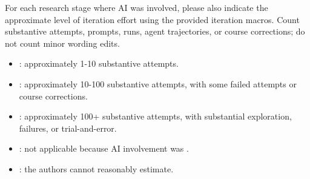 \documentclass{article}
\begin{document}
For each research stage where AI was involved, please also indicate the approximate level of iteration effort using the provided iteration macros. Count substantive attempts, prompts, runs, agent trajectories, or course corrections; do not count minor wording edits.

\begin{itemize}
    \item \iterationLow{}: approximately 1-10 substantive attempts.
    \item \iterationMedium{}: approximately 10-100 substantive attempts, with some failed attempts or course corrections.
    \item \iterationHigh{}: approximately 100+ substantive attempts, with substantial exploration, failures, or trial-and-error.
    \item \iterationNA{}: not applicable because AI involvement was \involvementA{}.
    \item \iterationUnclear{}: the authors cannot reasonably estimate.
\end{itemize}
\end{document}
